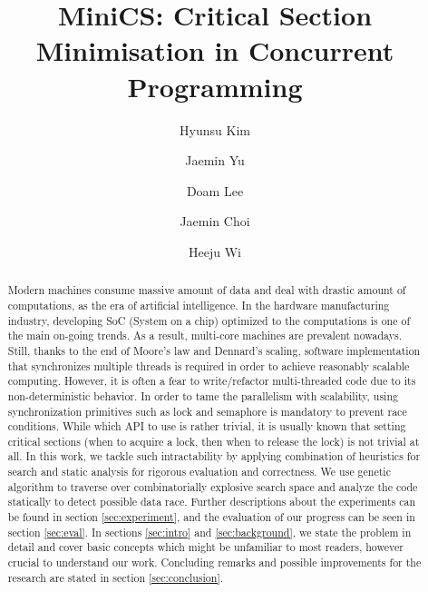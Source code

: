 \documentclass[sigconf]{acmart}
\begin{document}
\title{MiniCS: Critical Section Minimisation in Concurrent Programming}
\author{Hyunsu Kim}

\author{Jaemin Yu}

\author{Doam Lee}

\author{Jaemin Choi}

\author{Heeju Wi}

\begin{abstract}
Modern machines consume massive amount of data and deal with drastic amount of computations, as the era of artificial intelligence. In the hardware manufacturing industry, developing SoC (System on a chip) optimized to the computations is one of the main on-going trends. As a result, multi-core machines are prevalent nowadays. 
Still, thanks to the end of Moore's law and Dennard's scaling, software implementation that synchronizes multiple threads is required in order to achieve reasonably scalable computing. However, it is often a fear to write/refactor multi-threaded code due to its non-deterministic behavior. 
In order to tame the parallelism with scalability, using synchronization primitives such as lock and semaphore is mandatory to prevent race conditions. While which API to use is rather trivial, it is usually known that setting critical sections (when to acquire a lock, then when to release the lock) is not trivial at all. 
In this work, we tackle such intractability by applying combination of heuristics for search and static analysis for rigorous evaluation and correctness. We use genetic algorithm to traverse over combinatorially explosive search space and analyze the code statically to detect possible data race. Further descriptions about the experiments can be found in section \ref{sec:experiment}, and the evaluation of our progress can be seen in section \ref{sec:eval}. In sections \ref{sec:intro} and \ref{sec:background}, we state the problem in detail and cover basic concepts which might be unfamiliar to most readers, however crucial to understand our work. Concluding remarks and possible improvements for the research are stated in section \ref{sec:conclusion}.
\end{abstract}
\end{document}

